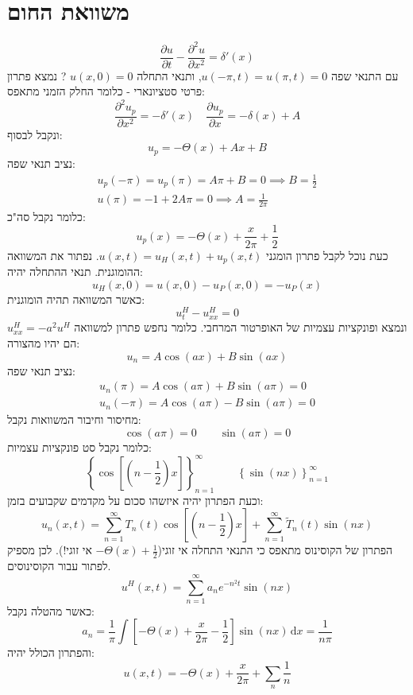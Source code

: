 \documentclass{tstextbook}
\begin{document}
\section{משוואת החום}

$$\frac{\partial u}{\partial t}-\frac{\partial ^2u}{\partial x^2}=\delta'(x)$$
עם התנאי שפה \(u\left( -\pi,t \right)=u\left( \pi,t \right)=0\), ותנאי התחלה \(u(x,0)=0\)
?
נמצא פתרון פרטי סטציונארי - כלומר החלק הזמני מתאפס:
$$\frac{\partial ^2u_{p}}{\partial x^2}=-\delta'(x)\quad \frac{\partial u_{p}}{\partial x}=-\delta(x)+A$$
ונקבל לבסוף:
$$u_{p}=-\Theta(x)+Ax+B$$
נציב תנאי שפה:
\begin{gather*}u_{p}\left( -\pi \right)=u_{p}\left( \pi \right)=A\pi+B=0\implies B=\frac{1}{2} \\u\left( \pi \right)=-1+2A\pi = 0\implies A=\frac{1}{2\pi}
\end{gather*}
כלומר נקבל סה"כ:
$$u_{p}(x)=-\Theta(x)+\frac{x}{2\pi}+\frac{1}{2}$$
כעת נוכל לקבל פתרון הומגני \(u(x,t)=u_{H}(x,t)+u_{p}(x,t)\).
נפתור את המשוואה ההומוגנית. תנאי ההתחלה יהיה:
$$u_{H}(x,0)=u(x,0)-u_{P}(x,0)=-u_{P}(x)$$
כאשר המשוואה תהיה הומוגנית:
$$u_{t}^H-u_{x x}^H=0$$
ונמצא ופונקציות עצמיות של האופרטור המרחבי. כלומר נחפש פתרון למשוואה \(u_{x x}^H=-a^2u^H\) הם יהיו מהצורה:
$$u_{n}=A\cos(ax)+B\sin(ax)$$
נציב תנאי שפה:
\begin{gather*}u_{n}\left( \pi \right)=A\cos\left( a\pi \right)+B\sin\left( a\pi \right)=0 \\u_{n}\left( -\pi \right)=A\cos\left( a\pi \right)-B\sin\left( a\pi \right)=0
\end{gather*}
מחיסור וחיבור המשוואות נקבל:
$$\cos\left( a\pi \right)=0\qquad \sin\left( a\pi \right)=0$$
כלומר נקבל סט פונקציות עצמיות:
$$\left\{  \cos\left[ \left( n-\frac{1}{2} \right)x \right]  \right\}_{n=1}^\infty \qquad \left\{  \sin(nx)  \right\}_{n=1}^{\infty}$$
וכעת הפתרון יהיה איזשהו סכום על מקדמים שקבועים בזמן:
$$u_{n}(x,t)=\sum_{n=1}^\infty T_{n}(t)\cos\left[ \left( n-\frac{1}{2} \right)x \right]+\sum_{n=1}^\infty \tilde{T}_{n}(t)\sin(nx)$$
הפתרון של הקוסינוס מתאפס כי התנאי התחלה אי זוגי(\(-\Theta(x)+\frac{1}{2}\) אי זוגי!). לכן מספיק לפתור עבור הקוסינוסים.
$$u^H(x,t)=\sum_{n=1}^\infty a_{n}e^{-n^2t}\sin(nx)$$
כאשר מהטלה נקבל:
$$a_{n}=\frac{1}{\pi}\int \left[ -\Theta(x)+\frac{x}{2\pi}-\frac{1}{2} \right]\sin(nx) \, \mathrm{d}x =\frac{1}{n\pi}$$
והפתרון הכולל יהיה:
$$u(x,t)=-\Theta(x)+\frac{x}{2\pi}+\sum_{n} \frac{1}{n}$$
\end{document}

